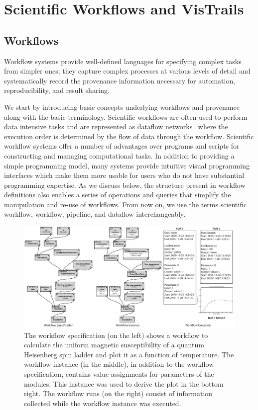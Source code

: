 \documentclass[12pt]{iopart}
\begin{document}
\appendix

\section{Scientific Workflows and VisTrails}


\subsection{ Workflows}

Workflow systems provide well-defined languages for specifying complex
tasks from simpler ones; they capture complex processes at various
levels of detail and systematically record the provenance information
necessary for automation, reproducibility, and result sharing.

We start by introducing basic concepts underlying
workflows and provenance along with the basic terminology.
Scientific workflows are often used to perform data intensive tasks
and are represented as dataflow networks~\cite{lee@ieee1995} where the
execution order is determined by the flow of data through the
workflow. Scientific workflow systems offer a number of advantages
over programs and scripts for constructing and
managing computational tasks. In addition to providing a simple
programming model, many systems provide intuitive visual programming
interfaces which make them more usable for users who do not have
substantial programming expertise. As we discuss below, the structure
present in workflow definitions also enables a series of operations
and queries that simplify the manipulation and re-use of workflows.
From now on, we use the terms scientific workflow, workflow, pipeline,
and dataflow interchangeably.

\begin{figure}[t]
\includegraphics[width=\linewidth]{figures/alps_provenance_types.pdf}
\caption{The workflow specification (on the left) shows a workflow to calculate the uniform magnetic susceptibility of a quantum Heisenberg spin ladder and plot it as a function of temperature.
 The workflow
  instance (in the middle), in addition to the workflow specification,
  contains value assignments for parameters of the modules. This
  instance was used to derive the plot in the bottom right. The
  workflow runs (on the right) consist of information collected while
  the workflow instance was executed. }
\vspace{0cm}
\label{fig:workflow-spec-run}
\end{figure}
\end{document}
